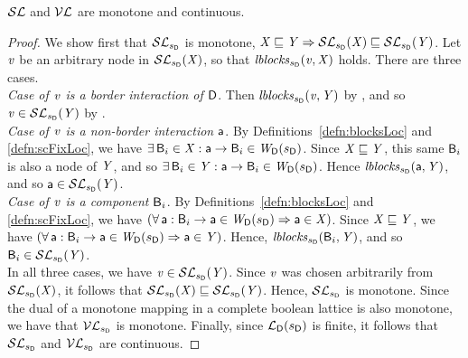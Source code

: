 \begin{proposition} \label{prop:monotoneLoc}
$\lSFsymb$ and $\lVFsymb$ are monotone and continuous.
\end{proposition}
%
\begin{proof}
We show first that $\lSFsymb_{\sD}$ is monotone, \ie $\XS \subg \YS \imp \lSFs{\sD}{\XS} \subg \lSFs{\sD}{\YS}$.
Let $\ndv$ be an arbitrary node in $\lSFs{\sD}{\XS}$, so that $\lblocks{\sD}{\ndv}{\XS}$ holds. There are three cases.\\

\emph{Case of $\ndv$ is a border interaction of $\DS$}. Then $\lblocks{\sD}{\ndv}{\YS}$ by , and so $\ndv \in  \lSFs{\sD}{\YS}$ by
.\\

\emph{Case of $\ndv$ is a non-border interaction $\act$}. By Definitions~\ref{defn:blocksLoc} and \ref{defn:scFixLoc}, we have
$\ex \B_i \in \XS  : \act \ar \B_i \in \lwfg{B}{\sD}{\DS}$.
Since $\XS \subg \YS$, this same $\B_i$ is also a node of $\YS$, and so  $\ex \B_i \in \YS  : \act \ar \B_i \in \lwfg{B}{\sD}{\DS}$. 
Hence  $\lblocks{\sD}{\act}{\YS}$, and so $\act \in \lSFs{\sD}{\YS}$. \\

\emph{Case of $\ndv$ is a component $\B_i$}. By Definitions~\ref{defn:blocksLoc} and \ref{defn:scFixLoc}, we have
$(\fa \act : \B_i \ar \act \in \lwfg{\B}{\sD}{\DS} \imp \act \in \XS)$.
Since $\XS \subg \YS$, we have  $(\fa \act : \B_i \ar \act \in \lwfg{B}{\sD}{\DS} \imp \act \in \YS)$. 
Hence, $\lblocks{\sD}{\B_i}{\YS}$, and so $\B_i \in \lSFs{\sD}{\YS}$. \\

In all three cases, we have $\ndv \in \lSFs{\sD}{\YS}$. Since $\ndv$ was chosen arbitrarily from $\lSFs{\sD}{\XS} $, it follows that
 $\lSFs{\sD}{\XS} \subg \lSFs{\sD}{\YS}$. Hence, $\lSFsymb_{\sD}$ is monotone.
%
Since the dual of a monotone mapping in a complete boolean lattice is also monotone, we have that $\lVFsymb_{\sD}$ is monotone.
%
Finally, since $\llat{\B}{\sD}{\DS}$ is finite, it follows that $\lSFsymb_{\sD}$ and $\lVFsymb_{\sD}$ are continuous.
\end{proof}




